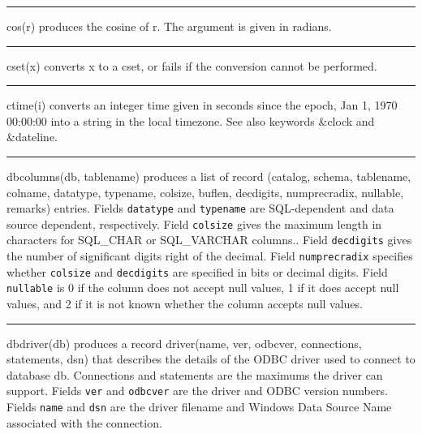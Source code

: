 \bigskip\hrule\vspace{0.1cm}

\noindent
{}cos(r) produces the cosine of r. The argument is given in
radians.

\bigskip\hrule\vspace{0.1cm}

\noindent
{}cset(x) converts x to a cset, or fails if the
conversion cannot be performed.

\bigskip\hrule\vspace{0.1cm}

\noindent
{}ctime(i) converts an integer time
given in seconds since the epoch, Jan 1, 1970 00:00:00 into a string in
the local timezone. See also keywords \&clock and \&dateline.

\bigskip\hrule\vspace{0.1cm}

\noindent
{}dbcolumns(db, tablename) produces a list of record
(catalog, schema, tablename, colname, datatype, typename, colsize,
buflen, decdigits, numprecradix, nullable, remarks) entries. Fields
\texttt{datatype} and \texttt{typename} are SQL-dependent and data
source dependent, respectively. Field \texttt{colsize} gives the
maximum length in characters for SQL\_CHAR or SQL\_VARCHAR columns..
Field \texttt{decdigits} gives the number of significant digits right
of the decimal. Field \texttt{numprecradix} specifies whether
\texttt{colsize} and \texttt{decdigits} are specified in bits or
decimal digits. Field \texttt{nullable} is 0 if the column does not
accept null values, 1 if it does accept null values, and 2 if it is not
known whether the column accepts null values.

\bigskip\hrule\vspace{0.1cm}

\noindent
{}dbdriver(db) produces a record driver(name, ver,
odbcver, connections, statements, dsn) that describes the details of
the ODBC driver used to connect to database db. Connections
and statements are the maximums the driver can support. Fields
\texttt{ver} and \texttt{odbcver} are the driver and ODBC version
numbers. Fields \texttt{name} and \texttt{dsn} are the driver filename
and Windows Data Source Name associated with the connection.

